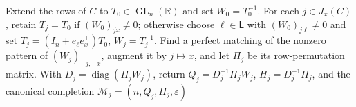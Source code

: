 Extend the rows of \(C\) to \(T_0\in\operatorname{GL}_n(\mathbb R)\) and set \(W_0=T_0^{-1}\). For each \(j\in J_x(C)\), retain \(T_j=T_0\) if \((W_0)_{jx}\ne0\); otherwise choose \(\ell\in\mathsf L\) with \((W_0)_{j\ell}\ne0\) and set \(T_j=(I_n+e_\ell e_x^\top)T_0\), \(W_j=T_j^{-1}\). Find a perfect matching of the nonzero pattern of \((W_j)_{-j,-x}\), augment it by \(j\mapsto x\), and let \(\Pi_j\) be its row-permutation matrix. With \(D_j=\operatorname{diag}(\Pi_jW_j)\), return \(Q_j=D_j^{-1}\Pi_jW_j\), \(H_j=D_j^{-1}\Pi_j\), and the canonical completion \(\mathcal M_j=(n,Q_j,H_j,\varepsilon)\)
